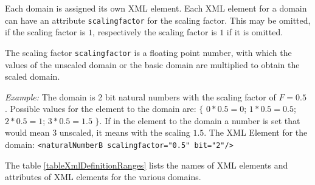 Each domain is assigned its own XML element. Each XML element for a domain can have an attribute \verb|scalingfactor| for the scaling factor. This may be omitted, if the scaling factor is $1$, respectively the scaling factor is $1$ if it is omitted.

The scaling factor \verb|scalingfactor| is a floating point number, with which the values of the unscaled domain or the basic domain are multiplied to obtain the scaled domain.

\noindent
\textit{Example:} The domain is 2 bit natural numbers with the scaling factor of $F=0.5$ . Possible values for the element to the domain are: $\{$ $0*0.5=0$; $1*0.5=0.5$; $2*0.5=1$; $3*0.5=1.5$ $\}$. If in the element to the domain a number is set that would mean $3$ unscaled, it means with the scaling $1.5$.
The XML Element for the domain: \verb|<naturalNumberB scalingfactor="0.5" bit="2"/>|

\bigskip\noindent
The table \ref{tableXmlDefinitionRanges} lists the names of XML elements and attributes of XML elements for the various domains.

